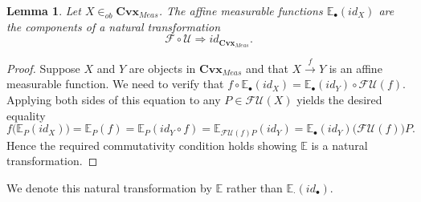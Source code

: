 \documentclass[11pt]{amsart}    %
\newtheorem{lemma}{Lemma}
\newcommand{\be}{\begin{equation}}
\newcommand{\ee}{\end{equation}}
\begin{document}
\begin{lemma} Let $X \in_{ob} \mathbf{Cvx}_{Meas}$.  The affine measurable functions $\mathbb{E}_{\bullet}(id_X)$ are the components of a  natural transformation
\be \nonumber
\mathcal{F} \circ \mathcal{U} \Rightarrow id_{\mathbf{Cvx}_{Meas}}.
\ee
\end{lemma}
\begin{proof}
Suppose $X$ and $Y$ are objects in $\mathbf{Cvx}_{Meas}$ and that $X \xrightarrow{f} Y$ is an affine measurable function.  We need to verify that $f \circ \mathbb{E}_{\bullet}(id_X) = \mathbb{E}_{\bullet}(id_Y) \circ \mathcal{F}\mathcal{U}(f)$.  Applying both sides of this equation to any $P \in \mathcal{F}\mathcal{U}(X)$ yields the desired equality
$$
 f\big(\mathbb{E}_{P}(id_X)\big) = \mathbb{E}_{P}(f) = \mathbb{E}_P(id_Y \circ f)=\mathbb{E}_{\mathcal{F}\mathcal{U}(f)P}(id_Y)=\mathbb{E}_{\bullet}(id_Y)\big(\mathcal{F}\mathcal{U} (f)\big)P.
$$
Hence the required commutativity condition holds showing $\mathbb{E}$ is a natural transformation. 

\end{proof}
We denote this natural transformation by $\mathbb{E}$ rather than $\mathbb{E}_{\cdot}(id_{\bullet})$.
\end{document}
